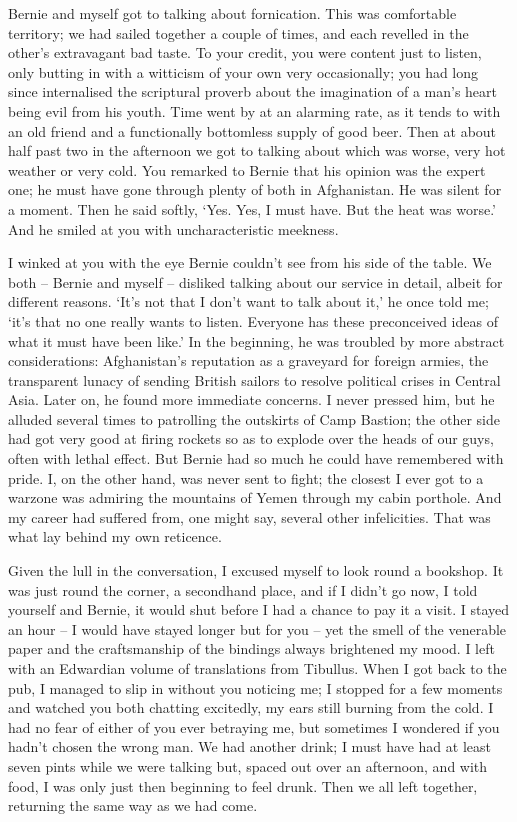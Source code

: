 \documentclass{amsbook}
\begin{document}
Bernie and myself got to talking about fornication. This was comfortable territory; we had sailed together a couple of times, and each revelled in the other's extravagant bad taste. To your credit, you were content just to listen, only butting in with a witticism of your own very occasionally; you had long since internalised the scriptural proverb about the imagination of a man's heart being evil from his youth. Time went by at an alarming rate, as it tends to with an old friend and a functionally bottomless supply of good beer. Then at about half past two in the afternoon we got to talking about which was worse, very hot weather or very cold. You remarked to Bernie that his opinion was the expert one; he must have gone through plenty of both in Afghanistan. He was silent for a moment. Then he said softly, `Yes. Yes, I must have. But the heat was worse.' And he smiled at you with uncharacteristic meekness.

I winked at you with the eye Bernie couldn't see from his side of the table. We both -- Bernie and myself -- disliked talking about our service in detail, albeit for different reasons. `It's not that I don't want to talk about it,' he once told me; `it's that no one really wants to listen. Everyone has these preconceived ideas of what it must have been like.' In the beginning, he was troubled by more abstract considerations: Afghanistan's reputation as a graveyard for foreign armies, the transparent lunacy of sending British sailors to resolve political crises in Central Asia. Later on, he found more immediate concerns. I never pressed him, but he alluded several times to patrolling the outskirts of Camp Bastion; the other side had got very good at firing rockets so as to explode over the heads of our guys, often with lethal effect. But Bernie had so much he could have remembered with pride. I, on the other hand, was never sent to fight; the closest I ever got to a warzone was admiring the mountains of Yemen through my cabin porthole. And my career had suffered from, one might say, several other infelicities. That was what lay behind my own reticence.

Given the lull in the conversation, I excused myself to look round a bookshop. It was just round the corner, a secondhand place, and if I didn't go now, I told yourself and Bernie, it would shut before I had a chance to pay it a visit. I stayed an hour -- I would have stayed longer but for you -- yet the smell of the venerable paper and the craftsmanship of the bindings always brightened my mood. I left with an Edwardian volume of translations from Tibullus. When I got back to the pub, I managed to slip in without you noticing me; I stopped for a few moments and watched you both chatting excitedly, my ears still burning from the cold. I had no fear of either of you ever betraying me, but sometimes I wondered if you hadn't chosen the wrong man. We had another drink; I must have had at least seven pints while we were talking but, spaced out over an afternoon, and with food, I was only just then beginning to feel drunk. Then we all left together, returning the same way as we had come.
\end{document}
